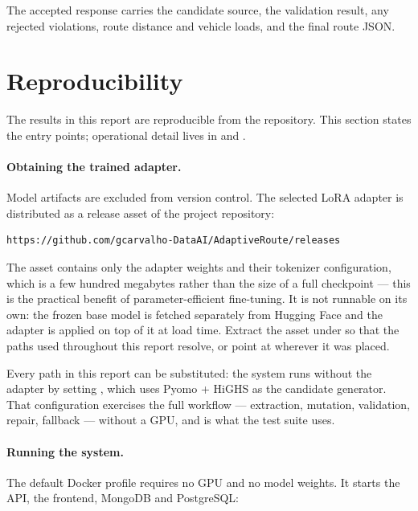 \documentclass[11pt,a4paper]{article}
\begin{document}
The accepted response carries the candidate source, the validation result, any rejected violations,
route distance and vehicle loads, and the final route JSON.

\section{Reproducibility}

The results in this report are reproducible from the repository. This section states the entry
points; operational detail lives in  and .

\paragraph{Obtaining the trained adapter.}
Model artifacts are excluded from version control. The selected LoRA adapter is distributed as a
release asset of the project repository:

\begin{verbatim}
https://github.com/gcarvalho-DataAI/AdaptiveRoute/releases
\end{verbatim}

The asset contains only the adapter weights and their tokenizer configuration, which is a few
hundred megabytes rather than the size of a full checkpoint --- this is the practical benefit of
parameter-efficient fine-tuning. It is not runnable on its own: the frozen base model
 is fetched separately from Hugging Face and the adapter is applied on
top of it at load time. Extract the asset under  so that the paths used
throughout this report resolve, or point
 at wherever it was placed.

Every path in this report can be substituted: the system runs without the adapter by setting
, which uses Pyomo + HiGHS as the candidate
generator. That configuration exercises the full workflow --- extraction, mutation, validation,
repair, fallback --- without a GPU, and is what the test suite uses.

\paragraph{Running the system.}
The default Docker profile requires no GPU and no model weights. It starts the API, the frontend,
MongoDB and PostgreSQL:
\end{document}
